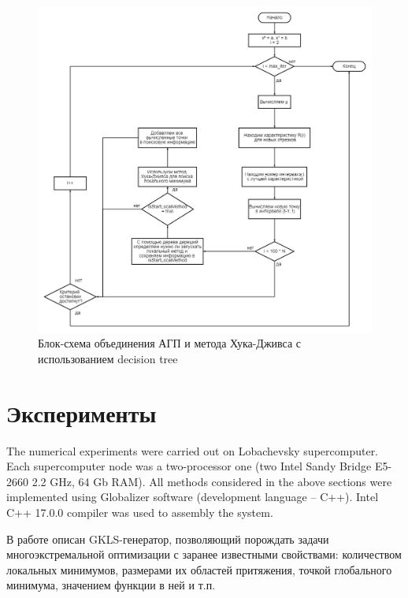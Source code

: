 \documentclass{svproc}
\begin{document}
\begin{figure}[ht!]

	\begin{center}
		\begin{minipage}[h]{0.9\linewidth}
			\includegraphics[width=1\linewidth]{figure/fig3.png}
			\caption{Блок-схема объединения АГП и метода Хука-Дживса с использованием decision tree} %
			\label{fig:fig3}
		\end{minipage}
	\end{center}
\end{figure}



\section{Эксперименты}

The numerical experiments were carried out on Lobachevsky supercomputer. Each supercomputer node was a two-processor one (two Intel Sandy Bridge E5-2660 2.2 GHz, 64 Gb RAM). All methods considered in the above sections were implemented using Globalizer software \cite{globalizerSystem} (development language – C++). Intel C++ 17.0.0 compiler was used to assembly the system.

В работе \cite{fio_bib13, fio_bib17} описан GKLS-генератор, позволяющий порождать задачи многоэкстремальной оптимизации с заранее известными свойствами: количеством локальных минимумов, размерами их областей притяжения, точкой глобального минимума, значением функции в ней и т.п.
\end{document}
